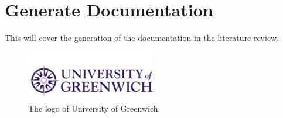 \section{Generate Documentation}
\label{s:Generate-Documentation}
This will cover the generation of the documentation in the literature review.
\begin{figure}[ht]
	\centering
	\includegraphics[width=0.5\textwidth]{../shared/greenwich-logo}
	\caption{The logo of University of Greenwich.}
	\label{f:Greenwich-Logo}
\end{figure}
